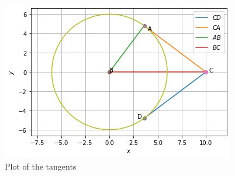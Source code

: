 \documentclass[journal,12pt,twocolumn]{IEEEtran}
\begin{document}
\begin{figure}[!ht]
    \centering
    \includegraphics{assignment3.png}
    \caption{Plot of the tangents}
    \label{plot}
\end{figure}
\end{document}
